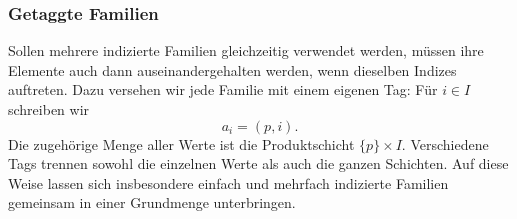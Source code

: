 \documentclass[main.tex]{subfiles}
\begin{document}
\begin{tabproof}
  
\end{tabproof}

\subsubsection{Getaggte Familien}

Sollen mehrere indizierte Familien gleichzeitig verwendet werden, müssen
ihre Elemente auch dann auseinandergehalten werden, wenn dieselben Indizes
auftreten. Dazu versehen wir jede Familie mit einem eigenen Tag: Für
\(i\in I\) schreiben wir
\[
  a_i=(p,i).
\]
Die zugehörige Menge aller Werte ist die Produktschicht
\(\{p\}\times I\). Verschiedene Tags trennen sowohl die einzelnen Werte
als auch die ganzen Schichten. Auf diese Weise lassen sich insbesondere
einfach und mehrfach indizierte Familien gemeinsam in einer Grundmenge
unterbringen.
\end{document}
